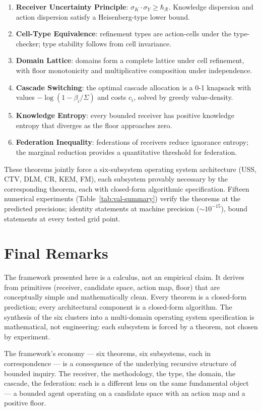 \documentclass[11pt,a4paper]{article}
\newcommand{\receiver}{\mathcal{R}}
\newcommand{\Sigmax}{\Sigma}
\newcommand{\hbarR}{\hbar_{\receiver}}
\newcommand{\disp}{\sigma}
\begin{document}
\begin{enumerate}[nosep,leftmargin=*]
\item \textbf{Receiver Uncertainty Principle}: $\disp_K \cdot \disp_Y \geq \hbarR$. Knowledge dispersion and action dispersion satisfy a Heisenberg-type lower bound.
\item \textbf{Cell-Type Equivalence}: refinement types are action-cells under the type-checker; type stability follows from cell invariance.
\item \textbf{Domain Lattice}: domains form a complete lattice under cell refinement, with floor monotonicity and multiplicative composition under independence.
\item \textbf{Cascade Switching}: the optimal cascade allocation is a 0-1 knapsack with values $-\log(1-\beta_i/\Sigmax)$ and costs $c_i$, solved by greedy value-density.
\item \textbf{Knowledge Entropy}: every bounded receiver has positive knowledge entropy that diverges as the floor approaches zero.
\item \textbf{Federation Inequality}: federations of receivers reduce ignorance entropy; the marginal reduction provides a quantitative threshold for federation.
\end{enumerate}

These theorems jointly force a six-subsystem operating system architecture (USS, CTV, DLM, CR, KEM, FM), each subsystem provably necessary by the corresponding theorem, each with closed-form algorithmic specification. Fifteen numerical experiments (Table~\ref{tab:val-summary}) verify the theorems at the predicted precisions; identity statements at machine precision ($\sim 10^{-15}$), bound statements at every tested grid point.

\section{Final Remarks}

The framework presented here is a calculus, not an empirical claim. It derives from primitives (receiver, candidate space, action map, floor) that are conceptually simple and mathematically clean. Every theorem is a closed-form prediction; every architectural component is a closed-form algorithm. The synthesis of the six clusters into a multi-domain operating system specification is mathematical, not engineering: each subsystem is forced by a theorem, not chosen by experiment.

The framework's economy — six theorems, six subsystems, each in correspondence — is a consequence of the underlying recursive structure of bounded inquiry. The receiver, the methodology, the type, the domain, the cascade, the federation: each is a different lens on the same fundamental object — a bounded agent operating on a candidate space with an action map and a positive floor.



\end{document}
